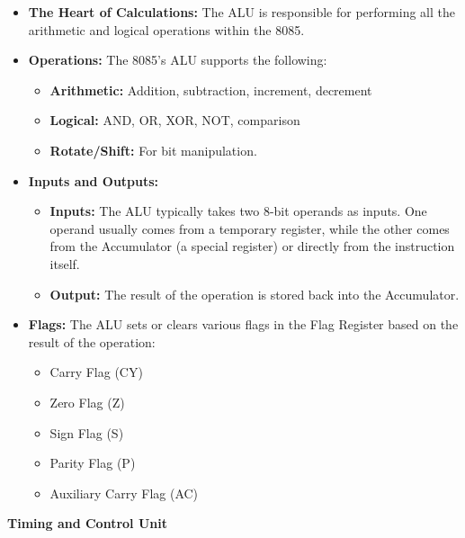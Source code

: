 \documentclass[
]{article}
\begin{document}
\begin{itemize}
\item
  \textbf{The Heart of Calculations:} The ALU is responsible for
  performing all the arithmetic and logical operations within the 8085.
\item
  \textbf{Operations:} The 8085's ALU supports the following:

  \begin{itemize}
  \item
    \textbf{Arithmetic:} Addition, subtraction, increment, decrement
  \item
    \textbf{Logical:} AND, OR, XOR, NOT, comparison
  \item
    \textbf{Rotate/Shift:} For bit manipulation.
  \end{itemize}
\item
  \textbf{Inputs and Outputs:}

  \begin{itemize}
  \item
    \textbf{Inputs:} The ALU typically takes two 8-bit operands as
    inputs. One operand usually comes from a temporary register, while
    the other comes from the Accumulator (a special register) or
    directly from the instruction itself.
  \item
    \textbf{Output:} The result of the operation is stored back into the
    Accumulator.
  \end{itemize}
\item
  \textbf{Flags:} The ALU sets or clears various flags in the Flag
  Register based on the result of the operation:

  \begin{itemize}
  \item
    Carry Flag (CY)
  \item
    Zero Flag (Z)
  \item
    Sign Flag (S)
  \item
    Parity Flag (P)
  \item
    Auxiliary Carry Flag (AC)
  \end{itemize}
\end{itemize}

\textbf{Timing and Control Unit}
\end{document}
